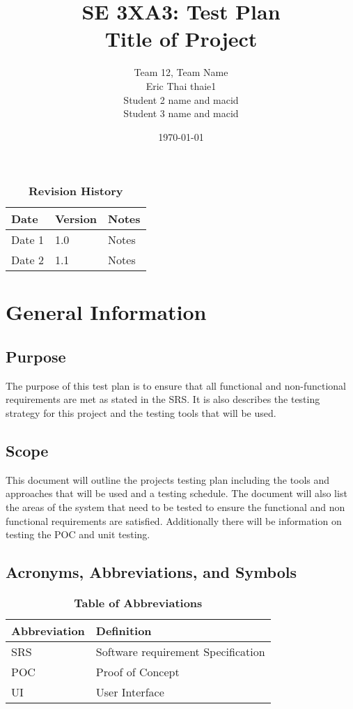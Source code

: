 \documentclass[12pt, titlepage]{article}
\title{SE 3XA3: Test Plan\\Title of Project}
\author{Team 12, Team Name
		\\ Eric Thai thaie1
		\\ Student 2 name and macid
		\\ Student 3 name and macid
}
\date{\today}
\begin{document}
\maketitle

\tableofcontents
\listoftables
\listoffigures

\begin{table}[bp]
\caption{\bf Revision History}
\begin{tabularx}{\textwidth}{p{3cm}p{2cm}X}
\toprule {\bf Date} & {\bf Version} & {\bf Notes}\\
\midrule
Date 1 & 1.0 & Notes\\
Date 2 & 1.1 & Notes\\
\bottomrule
\end{tabularx}
\end{table}

\newpage


\section{General Information}

\subsection{Purpose}
The purpose of this test plan is to ensure that all functional and non-functional requirements are met as stated in the SRS. It is also describes the testing strategy for this project and the testing tools that will be used.

\subsection{Scope}
This document will outline the projects testing plan including the tools and approaches that will be used and a testing schedule. The document will also list the areas of the system that need to be tested to ensure the functional and non functional requirements are satisfied. Additionally there will be information on testing the POC and unit testing.
\subsection{Acronyms, Abbreviations, and Symbols}
	
\begin{table}[hbp]
\caption{\textbf{Table of Abbreviations}} \label{Table}

\begin{tabularx}{\textwidth}{p{3cm}X}
\toprule
\textbf{Abbreviation} & \textbf{Definition} \\
\midrule
SRS & Software requirement Specification\\
POC & Proof of Concept\\
UI & User Interface\\
\bottomrule
\end{tabularx}

\end{table}
\end{document}
